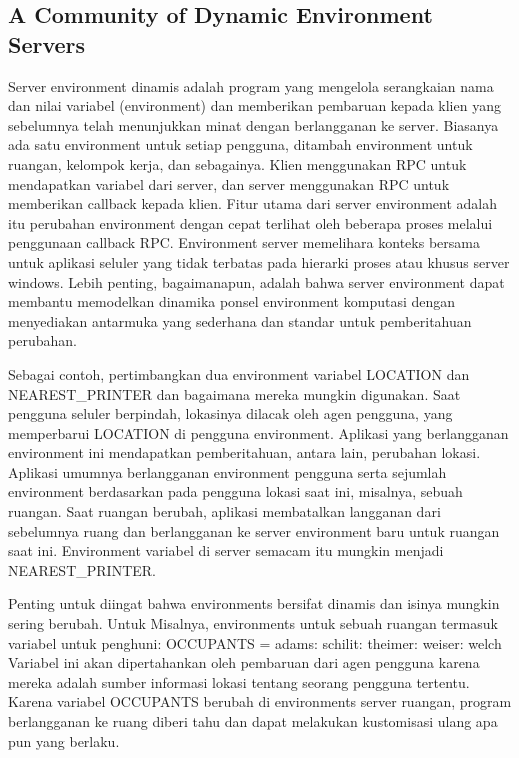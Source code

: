 \subsection {A Community of Dynamic Environment Servers}

Server environment dinamis adalah program yang mengelola serangkaian nama dan nilai variabel (environment) dan memberikan pembaruan kepada klien yang sebelumnya telah menunjukkan minat dengan berlangganan ke server. Biasanya ada satu environment untuk setiap pengguna, ditambah environment untuk ruangan, kelompok kerja, dan sebagainya. Klien menggunakan RPC untuk mendapatkan variabel dari server, dan server menggunakan RPC untuk memberikan callback kepada klien. Fitur utama dari server environment adalah itu perubahan environment dengan cepat terlihat oleh beberapa proses melalui penggunaan callback RPC. Environment server memelihara konteks bersama untuk aplikasi seluler yang tidak terbatas pada hierarki proses atau khusus server windows. Lebih penting, bagaimanapun, adalah bahwa server environment dapat membantu memodelkan dinamika ponsel environment komputasi dengan menyediakan antarmuka yang sederhana dan standar untuk pemberitahuan perubahan.

Sebagai contoh, pertimbangkan dua environment variabel LOCATION dan NEAREST_PRINTER dan bagaimana mereka mungkin digunakan. Saat pengguna seluler berpindah, lokasinya dilacak oleh agen pengguna, yang memperbarui LOCATION di pengguna environment. Aplikasi yang berlangganan environment ini mendapatkan pemberitahuan, antara lain, perubahan lokasi.
Aplikasi umumnya berlangganan environment pengguna serta sejumlah environment berdasarkan pada pengguna lokasi saat ini, misalnya, sebuah ruangan. Saat ruangan berubah, aplikasi membatalkan langganan dari sebelumnya ruang dan berlangganan ke server environment baru untuk ruangan saat ini. Environment variabel di server semacam itu mungkin menjadi NEAREST_PRINTER.

Penting untuk diingat bahwa environments bersifat dinamis dan isinya mungkin sering berubah. Untuk Misalnya, environments untuk sebuah ruangan termasuk variabel untuk penghuni:
OCCUPANTS = adams: schilit: theimer: weiser: welch 
Variabel ini akan dipertahankan oleh pembaruan dari agen pengguna karena mereka adalah sumber informasi lokasi tentang seorang pengguna tertentu. Karena variabel OCCUPANTS berubah di environments server ruangan, program berlangganan ke ruang diberi tahu dan dapat melakukan kustomisasi ulang apa pun yang berlaku.
\cite{schilit1993customizing}


